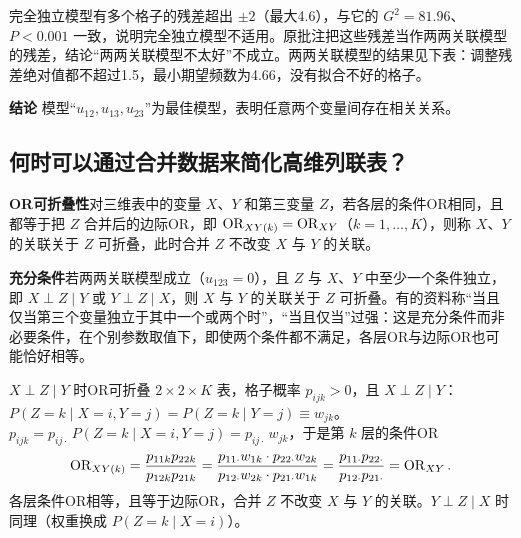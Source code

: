 \begin{annotation}完全独立模型有多个格子的残差超出 $\pm2$（最大4.6），与它的 $G^2=81.96$、$P<0.001$ 一致，说明完全独立模型不适用。原批注把这些残差当作两两关联模型的残差，结论“两两关联模型不太好”不成立。两两关联模型的结果见下表：调整残差绝对值都不超过1.5，最小期望频数为4.66，没有拟合不好的格子。\end{annotation}
\textbf{结论} 模型“$u_{12},u_{13},u_{23}$”为最佳模型，表明任意两个变量间存在相关关系。
\subsection{何时可以通过合并数据来简化高维列联表？}
\textbf{OR可折叠性}\quad 对三维表中的变量 $X$、$Y$ 和第三变量 $Z$，若各层的条件OR相同，且都等于把 $Z$ 合并后的边际OR，即 $\operatorname{OR}_{XY(k)}=\operatorname{OR}_{XY}$（$k=1,\ldots,K$），则称 $X$、$Y$ 的关联关于 $Z$ 可折叠，此时合并 $Z$ 不改变 $X$ 与 $Y$ 的关联。

\textbf{充分条件}\quad 若两两关联模型成立（$u_{123}=0$），且 $Z$ 与 $X$、$Y$ 中至少一个条件独立，即 $X\perp Z\mid Y$ 或 $Y\perp Z\mid X$，则 $X$ 与 $Y$ 的关联关于 $Z$ 可折叠。有的资料称“当且仅当第三个变量独立于其中一个或两个时”，“当且仅当”过强：这是充分条件而非必要条件，在个别参数取值下，即使两个条件都不满足，各层OR与边际OR也可能恰好相等。
\begin{derivation}{$X\perp Z\mid Y$ 时OR可折叠}
$2\times2\times K$ 表，格子概率 $p_{ijk}>0$，且 $X\perp Z\mid Y$：$P(Z=k\mid X=i,Y=j)=P(Z=k\mid Y=j)\equiv w_{jk}$。
$p_{ijk}=p_{ij\cdot}\,P(Z=k\mid X=i,Y=j)=p_{ij\cdot}\,w_{jk}$，于是第 $k$ 层的条件OR
\[
\operatorname{OR}_{XY(k)}=\frac{p_{11k}p_{22k}}{p_{12k}p_{21k}}=\frac{p_{11\cdot}w_{1k}\cdot p_{22\cdot}w_{2k}}{p_{12\cdot}w_{2k}\cdot p_{21\cdot}w_{1k}}=\frac{p_{11\cdot}p_{22\cdot}}{p_{12\cdot}p_{21\cdot}}=\operatorname{OR}_{XY}.
\]
各层条件OR相等，且等于边际OR，合并 $Z$ 不改变 $X$ 与 $Y$ 的关联。$Y\perp Z\mid X$ 时同理（权重换成 $P(Z=k\mid X=i)$）。
\end{derivation}

